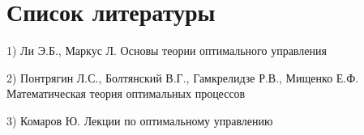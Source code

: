 \documentclass{article}
\theoremstyle{definition}
\begin{document}
	\section{Список литературы}

	1) Ли Э.Б., Маркус Л. Основы теории оптимального управления

	2) Понтрягин Л.С., Болтянский В.Г., Гамкрелидзе Р.В., Мищенко Е.Ф. Математическая теория оптимальных процессов

	3) Комаров Ю. Лекции по оптимальному управлению
\end{document}
